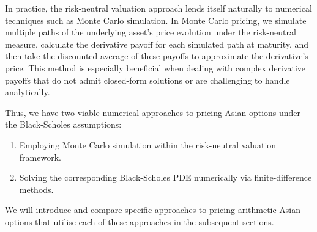 In practice, the risk-neutral valuation approach lends itself naturally to numerical techniques such as Monte Carlo simulation. 
In Monte Carlo pricing, we simulate multiple paths of the underlying asset's price evolution under the risk-neutral measure, 
calculate the derivative payoff for each simulated path at maturity, and then take the discounted average of these payoffs to 
approximate the derivative's price. This method is especially beneficial when dealing with complex derivative 
payoffs that do not admit closed-form solutions or are challenging to handle analytically.

Thus, we have two viable numerical approaches to pricing Asian options under the Black-Scholes assumptions:
\begin{enumerate}
\item Employing Monte Carlo simulation within the risk-neutral valuation framework.
\item Solving the corresponding Black-Scholes PDE numerically via finite-difference methods.
\end{enumerate}

We will introduce and compare specific approaches to pricing arithmetic Asian options that utilise each of these approaches
in the subsequent sections.